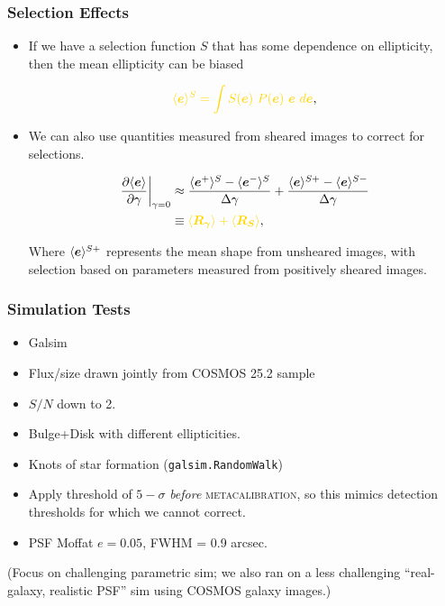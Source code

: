 \documentclass{beamer}
\newcommand{\mcal}{\textsc{metacalibration}}
\newcommand{\mcalRg}{\mbox{\boldmath $R_\gamma$}}
\newcommand{\mcalRS}{\mbox{\boldmath $R_S$}}
\newcommand{\vest}{\mbox{\boldmath $e$}}
\begin{document}
\frame
{
    \frametitle{Selection Effects}

 
    \begin{itemize}

        \item If we have a selection function $S$ that has some dependence
            on ellipticity, then the mean ellipticity
            can be biased

            \begin{align}
                {\color{gold} \langle \vest \rangle^S = \int S(\vest)~P(\vest)~\vest~d\vest},
            \end{align}


        \item We can also use quantities measured from sheared images
            to correct for selections. 

            \begin{align}
                \frac{\partial \langle \vest \rangle}{\partial \gamma}\bigg|_{\gamma=0} &\approx
                \frac{\langle \vest^+ \rangle^S - \langle \vest^- \rangle^S}{\Delta \gamma} + \frac{\langle \vest \rangle^{S+} - \langle \vest \rangle^{S-}}{\Delta \gamma} \nonumber \\
                &\equiv {\color{gold} \langle \mcalRg \rangle + \langle \mcalRS \rangle},
            \end{align}

            Where {\color{lightsteelblue} $\langle \vest \rangle^{S+}$}
            represents the mean shape from unsheared images, with selection
            based on parameters measured from
            positively sheared images.

    \end{itemize}

}

\frame
{

    \frametitle{Simulation Tests}


    \begin{itemize}
        \item Galsim
        \item Flux/size drawn jointly from COSMOS 25.2 sample
        \item $S/N$ down to 2.
        \item Bulge+Disk with different ellipticities.
        \item Knots of star formation (\texttt{galsim.RandomWalk})
        \item Apply threshold of $5-\sigma$ {\em before} \mcal, so this
            mimics detection thresholds for which we cannot correct.
        \item PSF Moffat $e=0.05$, FWHM = 0.9 arcsec.
    \end{itemize}

    (Focus on challenging parametric sim; we also ran on a less challenging 
    ``real-galaxy, realistic PSF'' sim using COSMOS galaxy images.)

}
\end{document}
